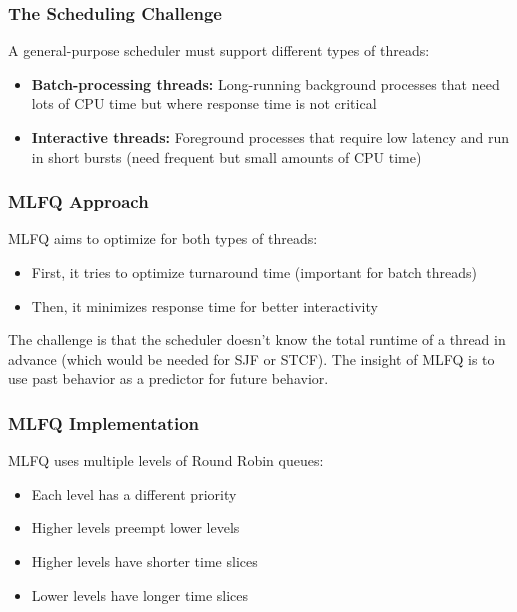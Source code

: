\documentclass[../../compsys.tex]{subfiles}
\begin{document}
\subsubsection{The Scheduling Challenge}
A general-purpose scheduler must support different types of threads:
\begin{itemize}
    \item \textbf{Batch-processing threads:} Long-running background processes that need lots of CPU time but where response time is not critical
    \item \textbf{Interactive threads:} Foreground processes that require low latency and run in short bursts (need frequent but small amounts of CPU time)
\end{itemize}

\subsubsection{MLFQ Approach}
MLFQ aims to optimize for both types of threads:
\begin{itemize}
    \item First, it tries to optimize turnaround time (important for batch threads)
    \item Then, it minimizes response time for better interactivity
\end{itemize}

The challenge is that the scheduler doesn't know the total runtime of a thread in advance (which would be needed for SJF or STCF). The insight of MLFQ is to use past behavior as a predictor for future behavior.

\subsubsection{MLFQ Implementation}
MLFQ uses multiple levels of Round Robin queues:
\begin{itemize}
    \item Each level has a different priority
    \item Higher levels preempt lower levels
    \item Higher levels have shorter time slices
    \item Lower levels have longer time slices
\end{itemize}
\end{document}
